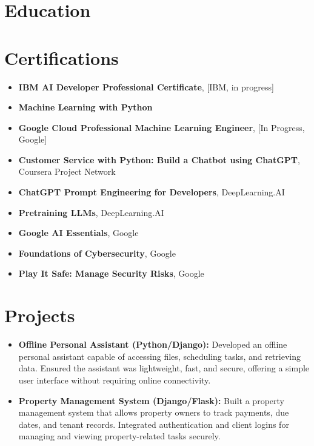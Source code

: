 \documentclass[a4paper,10pt]{moderncv}
\begin{document}
\section{Education}

\section{Certifications}
\begin{itemize}
    \item \textbf{IBM AI Developer Professional Certificate}, [IBM, in progress]
    \item \textbf{Machine Learning with Python}
    \item \textbf{Google Cloud Professional Machine Learning Engineer}, [In Progress, Google]
    \item \textbf{Customer Service with Python: Build a Chatbot using ChatGPT}, Coursera Project Network
    \item \textbf{ChatGPT Prompt Engineering for Developers}, DeepLearning.AI
    \item \textbf{Pretraining LLMs}, DeepLearning.AI
    \item \textbf{Google AI Essentials}, Google
    \item \textbf{Foundations of Cybersecurity}, Google
    \item \textbf{Play It Safe: Manage Security Risks}, Google
\end{itemize}


\section{Projects}
\begin{itemize}
    \item \textbf{Offline Personal Assistant (Python/Django):} Developed an offline personal assistant capable of accessing files, scheduling tasks, and retrieving data. Ensured the assistant was lightweight, fast, and secure, offering a simple user interface without requiring online connectivity.
    \item \textbf{Property Management System (Django/Flask):} Built a property management system that allows property owners to track payments, due dates, and tenant records. Integrated authentication and client logins for managing and viewing property-related tasks securely.
\end{itemize}
\end{document}
